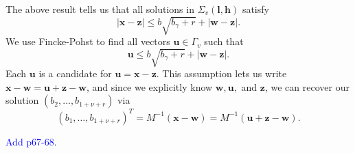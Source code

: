 \documentclass[11pt]{report}
\newtheorem{lemma}[theorem]{Lemma}
\theoremstyle{definition}
\DeclareMathOperator{\ord}{ord}
\newcommand{\edit}[1]{\textcolor{blue}{#1}}
\begin{document}
The above result tells us that all solutions in $\Sigma_v(\mathbf{l},\mathbf{h})$ satisfy
\[|\mathbf{x} - \mathbf{z}| \leq b\sqrt{b_{\gamma} + r} + |\mathbf{w} - \mathbf{z}|.\]
We use Fincke-Pohst to find all vectors $\mathbf{u}\in \Gamma_v$ such that
\[\mathbf{u} \leq b\sqrt{b_{\gamma} + r} + |\mathbf{w} - \mathbf{z}|.\]
Each $\mathbf{u}$ is a candidate for $\mathbf{u} = \mathbf{x} - \mathbf{z}$. This assumption lets us write $\mathbf{x} - \mathbf{w} = \mathbf{u} + \mathbf{z} - \mathbf{w}$, and since we explicitly know $\mathbf{w}, \mathbf{u},$ and $\mathbf{z}$, we can recover our solution $(b_2, \dots, b_{1+\nu+r})$ via
\[(b_1,\dots, b_{1+\nu+r})^T = M^{-1}(\mathbf{x} - \mathbf{w}) = M^{-1}(\mathbf{u} + \mathbf{z} - \mathbf{w}).\]

\edit{Add p67-68}.









\end{document}
